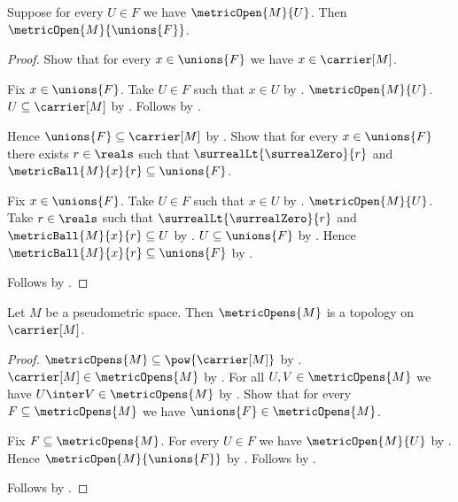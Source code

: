 \begin{theorem}\label{metric_open_arbitrary_union}
    Suppose for every $U\in F$ we have $\metricOpen{M}{U}$.
    Then $\metricOpen{M}{\unions{F}}$.
\end{theorem}
\begin{proof}
    Show that for every $x\in\unions{F}$ we have $x\in\carrier[M]$.
    \begin{subproof}
        Fix $x\in\unions{F}$.
        Take $U\in F$ such that $x\in U$ by .
        $\metricOpen{M}{U}$.
        $U\subseteq\carrier[M]$ by .
        Follows by .
    \end{subproof}
    Hence $\unions{F}\subseteq\carrier[M]$ by .
    Show that for every $x\in\unions{F}$ there exists $r\in\reals$
        such that $\surrealLt{\surrealZero}{r}$ and
            $\metricBall{M}{x}{r}\subseteq\unions{F}$.
    \begin{subproof}
        Fix $x\in\unions{F}$.
        Take $U\in F$ such that $x\in U$ by .
        $\metricOpen{M}{U}$.
        Take $r\in\reals$ such that
            $\surrealLt{\surrealZero}{r}$ and
            $\metricBall{M}{x}{r}\subseteq U$
            by .
        $U\subseteq\unions{F}$ by .
        Hence $\metricBall{M}{x}{r}\subseteq\unions{F}$
            by .
    \end{subproof}
    Follows by .
\end{proof}

\begin{theorem}\label{metric_opens_form_topology}
    Let $M$ be a pseudometric space.
    Then $\metricOpens{M}$ is a topology on $\carrier[M]$.
\end{theorem}
\begin{proof}
    $\metricOpens{M}\subseteq\pow{\carrier[M]}$
        by .
    $\carrier[M]\in\metricOpens{M}$
        by .
    For all $U,V\in\metricOpens{M}$ we have
        $U\inter V\in\metricOpens{M}$
        by .
    Show that for every $F\subseteq\metricOpens{M}$ we have
        $\unions{F}\in\metricOpens{M}$.
    \begin{subproof}
        Fix $F\subseteq\metricOpens{M}$.
        For every $U\in F$ we have $\metricOpen{M}{U}$
            by .
        Hence $\metricOpen{M}{\unions{F}}$
            by .
        Follows by .
    \end{subproof}
    Follows by .
\end{proof}

